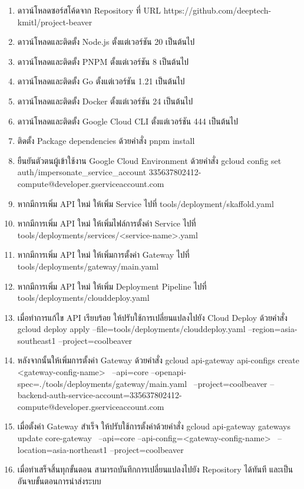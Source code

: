 \begin{enumerate}
	\item ดาวน์โหลดซอร์สโค้ดจาก Repository ที่ URL https://github.com/deeptech-kmitl/project-beaver
	\item ดาวน์โหลดและติดตั้ง Node.js ตั้งแต่เวอร์ชัน 20 เป็นต้นไป
	\item ดาวน์โหลดและติดตั้ง PNPM ตั้งแต่เวอร์ชัน 8 เป็นต้นไป
	\item ดาวน์โหลดและติดตั้ง Go ตั้งแต่เวอร์ชัน 1.21 เป็นต้นไป
	\item ดาวน์โหลดและติดตั้ง Docker ตั้งแต่เวอร์ชัน 24 เป็นต้นไป
	\item ดาวน์โหลดและติดตั้ง Google Cloud CLI ตั้งแต่เวอร์ชัน 444 เป็นต้นไป
	\item ติดตั้ง Package dependencies ด้วยคำสั่ง pnpm install
	\item ยืนยันตัวตนผู้เข้าใช้งาน Google Cloud Environment ด้วยคำสั่ง gcloud config set auth/impersonate\_service\_account 335637802412-compute@developer.gserviceaccount.com
	\item หากมีการเพิ่ม API ใหม่ ให้เพิ่ม Service ไปที่ tools/deployment/skaffold.yaml
	\item หากมีการเพิ่ม API ใหม่ ให้เพิ่มไฟล์การตั้งค่า Service ไปที่ tools/deployments/services/<service-name>.yaml
	\item หากมีการเพิ่ม API ใหม่ ให้เพิ่มการตั้งค่า Gateway ไปที่ tools/deployments/gateway/main.yaml
	\item หากมีการเพิ่ม API ใหม่ ให้เพิ่ม Deployment Pipeline ไปที่ tools/deployments/clouddeploy.yaml
	\item เมื่อทำการแก้ไข API เรียบร้อย ให้ปรับใช้การเปลี่ยนแปลงไปยัง Cloud Deploy ด้วยคำสั่ง gcloud deploy apply --file=tools/deployments/clouddeploy.yaml --region=asia-southeast1 --project=coolbeaver
	\item หลังจากนั้นให้เพิ่มการตั้งค่า Gateway ด้วยคำสั่ง gcloud api-gateway api-configs create <gateway-config-name> \
      --api=core --openapi-spec=./tools/deployments/gateway/main.yaml \
      --project=coolbeaver --backend-auth-service-account=335637802412-compute@developer.gserviceaccount.com
	\item เมื่อตั้งค่า Gateway สำเร็จ ให้ปรับใช้การตั้งค่าด้วยคำสั่ง gcloud api-gateway gateways update core-gateway \
      --api=core --api-config=<gateway-config-name> \
      --location=asia-northeast1 --project=coolbeaver
	\item เมื่อทำเสร็จสิ้นทุกขั้นตอน สามารถบันทึกการเปลี่ยนแปลงไปยัง Repository ได้ทันที และเป็นอันจบขั้นตอนการนำส่งระบบ
\end{enumerate}
